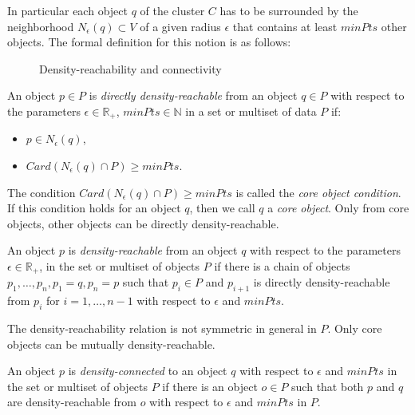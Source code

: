 In particular each object $q$ of the cluster $C$ 
has to be surrounded by the neighborhood $N_{\epsilon}(q) \subset V$
of a given radius $\epsilon$ that contains at least $minPts$ other objects.
The formal definition for this notion is as follows:

\begin{figure}
  \centering
  \caption{Density-reachability and connectivity}
  \label{fig:densityReach}
\end{figure}

\vspace{5pt}
\begin{definition}
\label{def:directly-den-reach}
An object $p \in P$ is \textit{directly
density-reachable} from an object $q\in P $ 
with respect to the parameters 
$\epsilon \in \mathbb{R}_+$, $minPts \in \mathbb{N}$ 
in a set or multiset of data $P$ if:
\begin{itemize}
  \item $p \in N_{\epsilon}(q)$, 
  \item $Card(N_{\epsilon}(q) \cap P) \geq minPts$.
\end{itemize}
\end{definition}
\vspace{5pt}

The condition $Card(N_{\epsilon}(q)  \cap P) \geq minPts$ is called the 
\textit{core object condition}. 
If this condition holds for an object $q$, then we call
$q$ a \textit{core object}. Only from core objects, other objects can be
directly density-reachable.

\vspace{5pt}
\begin{definition}
\label{def:den-reach}
An object $p$ is \textit{density-reachable} from an object $q$ 
with respect to the parameters 
$\epsilon \in \mathbb{R}_+$,
in the set or multiset of objects $P$ if there is a chain of objects $p_1,
\ldots, p_n, p_1=q,p_n=p$ such that $p_i \in P$ and $p_{i+1}$ is directly
density-reachable from $p_i$ for $i = 1, \ldots, n-1$ 
with respect to $\epsilon$ and $minPts$.
\end{definition}
\vspace{5pt}

The density-reachability relation is not symmetric in general in $P$. 
Only core objects can be mutually density-reachable.

\vspace{5pt}
\begin{definition}
\label{def:den-connect}
An object $p$ is \textit{density-connected} to an object $q$ 
with respect to $\epsilon$ and
$minPts$ in the set or multiset of objects $P$ if there is an object $o \in P$ 
such that both $p$ and $q$ are density-reachable from $o$ 
with respect to $\epsilon$ and $minPts$ in $P$.
\end{definition}
\vspace{5pt}

